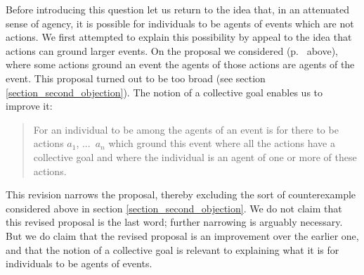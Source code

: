 \documentclass[12pt,a4paper]{extarticle}
\begin{document}
Before introducing this question
let us  return to the idea that, in an attenuated sense of agency, it is possible for individuals to be agents of events which are not actions.
We first attempted to explain this possibility by appeal to the idea that actions can ground larger events.
On the proposal we considered (p.\ \pageref{agency_proposal} above),
	where some actions ground an event the agents of those actions are agents of the event.
This proposal turned out to be too broad (see section \ref{section_second_objection}).
The notion of a collective goal enables us to improve it:
%
\begin{quote}
For an individual to be among the agents of an event is for there to be actions $a_1$, ...\ $a_n$ which ground this event where 	all the actions have a collective goal 
	and where 
	the individual is an agent of one or more of these actions.
\end{quote}
%
This revision narrows the proposal, thereby excluding the sort of counterexample considered above in section \ref{section_second_objection}. 
We do not claim that this revised proposal is the last word;
further narrowing is arguably necessary.
But we do claim that 
	the revised proposal is an improvement over the earlier one,
	and that 
	the notion of a collective goal is relevant to explaining what it is for individuals to be agents of events.
\end{document}
